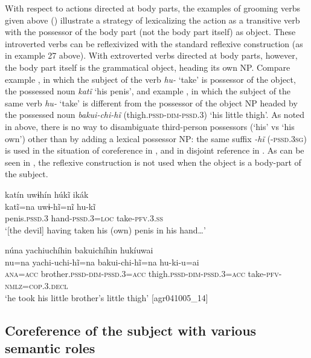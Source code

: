 \documentclass[output=paper]{langscibook}
\begin{document}
With respect to actions directed at body parts, the examples of grooming verbs given above () illustrate a strategy of lexicalizing the action as a transitive verb with the possessor of the body part (not the body part itself) as object. These introverted verbs can be reflexivized with the standard reflexive construction (as in example 27 above). With extroverted verbs directed at body parts, however, the body part itself is the grammatical object, heading its own NP. Compare example , in which the subject of the verb \textit{hu-} ‘take’ is possessor of the object, the possessed noun \textit{katĩ} ‘his penis’, and example , in which the subject of the same verb \textit{hu-} ‘take’ is different from the possessor of the object NP headed by the possessed noun \textit{bakui-chi-hĩ} (thigh.\textsc{pssd}{}-\textsc{dim-pssd.3}) ‘his little thigh’. As noted in  above, there is no way to disambiguate third-person possessors (‘his’ vs ‘his own’) other than by adding a lexical possessor NP: the same suffix \textit{{}-hĩ} (\textsc{{}-pssd.3sg}) is used in the situation of coreference in , and in disjoint reference in . As can be seen in , the reflexive construction is not used when the object is a body-part of the
subject.

\ea%
    \label{ex:overall:28}
    \glll katín uwɨhín húkĩ ikák\\
  katĩ=na  uwɨ-hĩ=nĩ  hu-kĩ\\
  penis.\textsc{pssd.3}  hand-\textsc{pssd.3=loc}  take-\textsc{pfv.3.ss}\\
  \glt ‘[the devil] having taken his (own) penis in his hand…’ \citep[467]{Overall2017}
\z

\ea%
    \label{ex:overall:29}
    \glll núna yachiuchíhin bakuichíhin hukíuwai\\
  nu=na  yachi-uchi-hĩ=na  bakui-chi-hĩ=na   hu-ki-u=ai\\
  \textsc{ana=acc}  brother.\textsc{pssd-dim-pssd.3=acc}  thigh.\textsc{pssd-dim-pssd.3=acc} take-\textsc{pfv-nmlz=cop.3.decl}\\
  \glt  ‘he took his little brother’s little thigh’ [agr041005\_14]
\z

\subsection{Coreference of the subject with various semantic roles} %
\label{sec:overall:4.3}
\end{document}
